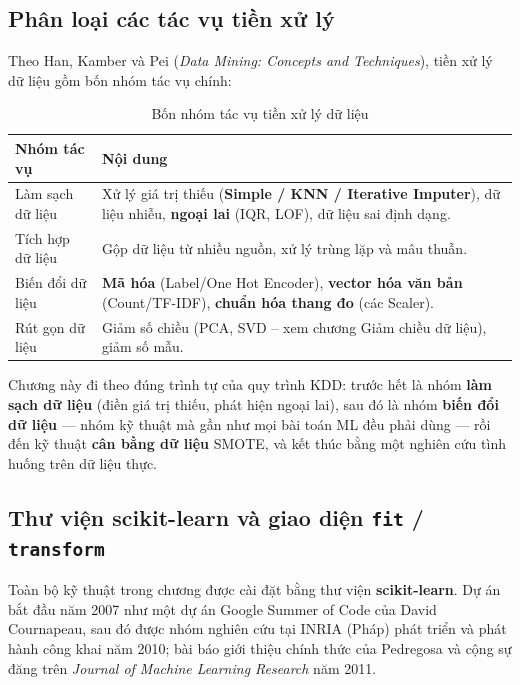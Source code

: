 
\subsection{Phân loại các tác vụ tiền xử lý}

Theo Han, Kamber và Pei (\textit{Data Mining: Concepts and Techniques}), tiền xử lý dữ liệu gồm bốn nhóm tác vụ chính:

\begin{table}[H]
\centering
\begin{tabular}{|p{3.2cm}|p{10cm}|}
\hline
\textbf{Nhóm tác vụ} & \textbf{Nội dung} \\
\hline
Làm sạch dữ liệu & Xử lý giá trị thiếu (\textbf{Simple / KNN / Iterative Imputer}), dữ liệu nhiễu, \textbf{ngoại lai} (IQR, LOF), dữ liệu sai định dạng. \\
\hline
Tích hợp dữ liệu & Gộp dữ liệu từ nhiều nguồn, xử lý trùng lặp và mâu thuẫn. \\
\hline
Biến đổi dữ liệu & \textbf{Mã hóa} (Label/One Hot Encoder), \textbf{vector hóa văn bản} (Count/TF-IDF), \textbf{chuẩn hóa thang đo} (các Scaler). \\
\hline
Rút gọn dữ liệu & Giảm số chiều (PCA, SVD -- xem chương Giảm chiều dữ liệu), giảm số mẫu. \\
\hline
\end{tabular}
\caption{Bốn nhóm tác vụ tiền xử lý dữ liệu}
\label{tab:preproc-tasks}
\end{table}

Chương này đi theo đúng trình tự của quy trình KDD: trước hết là nhóm \textbf{làm sạch dữ liệu} (điền giá trị thiếu, phát hiện ngoại lai), sau đó là nhóm \textbf{biến đổi dữ liệu} --- nhóm kỹ thuật mà gần như mọi bài toán ML đều phải dùng --- rồi đến kỹ thuật \textbf{cân bằng dữ liệu} SMOTE, và kết thúc bằng một nghiên cứu tình huống trên dữ liệu thực.

\subsection{Thư viện scikit-learn và giao diện \texttt{fit} / \texttt{transform}}

Toàn bộ kỹ thuật trong chương được cài đặt bằng thư viện \textbf{scikit-learn}. Dự án bắt đầu năm 2007 như một dự án Google Summer of Code của David Cournapeau, sau đó được nhóm nghiên cứu tại INRIA (Pháp) phát triển và phát hành công khai năm 2010; bài báo giới thiệu chính thức của Pedregosa và cộng sự đăng trên \textit{Journal of Machine Learning Research} năm 2011.

